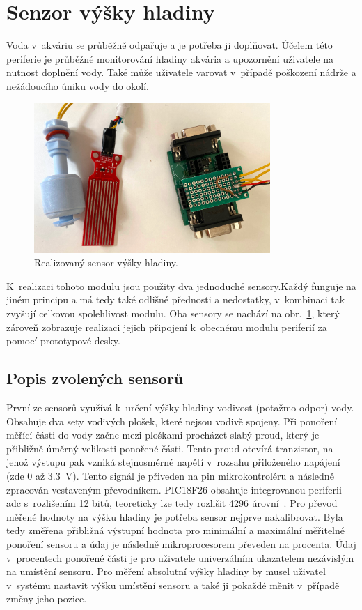 \section{Senzor výšky hladiny}
\label{sec:perif-sensor-hladina}
    Voda v~akváriu se průběžně odpařuje a je potřeba ji doplňovat. Účelem této periferie je průběžné monitorování hladiny akvária a upozornění uživatele na nutnost doplnění vody. Také může uživatele varovat v~případě poškození nádrže a nežádoucího úniku vody do okolí. 

    \begin{figure}[h!]
        \centering
        \includegraphics[width=0.8\textwidth]{obrazky/foto/sensor_hladiny.jpeg}
        \caption{Realizovaný sensor výšky hladiny.}
        \label{fig:obrazky-foto-sensor_hladiny-jpeg}
    \end{figure}
    

    K~realizaci tohoto modulu jsou použity dva jednoduché sensory.Každý funguje na jiném principu a má tedy také odlišné přednosti a nedostatky, v~kombinaci tak zvyšují celkovou spolehlivost modulu. Oba sensory se nachází na obr.~\ref{fig:obrazky-foto-sensor_hladiny-jpeg}, který zároveň zobrazuje realizaci jejich připojení k~obecnému modulu periferií za pomocí prototypové desky. 

    \subsection{Popis zvolených sensorů}
    První ze sensorů využívá k~určení výšky hladiny vodivost (potažmo odpor) vody. Obsahuje dva sety vodivých plošek, které nejsou vodivě spojeny. Při ponoření měřící části do vody začne mezi ploškami procházet slabý proud, který je přibližně úměrný velikosti ponořené části. Tento proud otevírá tranzistor, na jehož výstupu pak vzniká stejnosměrné napětí v~rozsahu přiloženého napájení (zde 0 až \qty{3.3}{V}). Tento signál je přiveden na pin mikrokontroléru a následně zpracován vestaveným převodníkem. PIC18F26 obsahuje integrovanou periferii \acs{adc} s~rozlišením 12 bitů, teoreticky lze tedy rozlišit \num{4296} úrovní~\cite{PIC18F26Q83}. Pro převod měřené hodnoty na výšku hladiny je potřeba sensor nejprve nakalibrovat. Byla tedy změřena přibližná výstupní hodnota pro minimální a maximální měřitelné ponoření sensoru a údaj je následně mikroprocesorem převeden na procenta. Údaj v~procentech ponořené části je pro uživatele univerzálním ukazatelem nezávislým na umístění sensoru. Pro měření absolutní výšky hladiny by musel uživatel v~systému nastavit výšku umístění sensoru a také ji pokaždé měnit v~případě změny jeho pozice.

